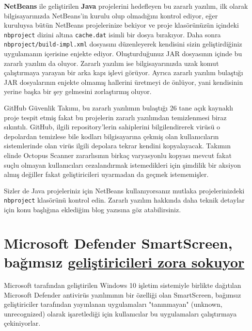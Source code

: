 \documentclass[11pt]{article}
\begin{document}
\textbf{NetBeans} ile geliştirilen \textbf{Java} projelerini hedefleyen bu zararlı yazılım,
ilk olarak bilgisayarınızda NetBeans'in kurulu olup olmadığını kontrol ediyor,
eğer kuruluysa bütün NetBeans projelerinize bekiyor ve proje klasörünüzün
içindeki \texttt{nbproject} dizini altına \texttt{cache.dat} isimli bir dosya bırakıyor.
Daha sonra \texttt{nbproject/build-impl.xml} dosyasını düzenleyerek kendisini sizin
geliştirdiğiniz uygulamanın içerisine enjekte ediyor. Oluşturduğunuz JAR
dosyasının içinde bu zararlı yazılım da oluyor. Zararlı yazılım ise
bilgisayarınızda uzak komut çalıştırmaya yarayan bir arka kapı işlevi görüyor.
Ayrıca zararlı yazılım bulaştığı JAR dosyalarının enjekte olmamış hallerini
üretmeyi de önlüyor, yani kendisinin yerine başka bir şey gelmesini
zorlaştırmış oluyor.

GitHub Güvenlik Takımı, bu zararlı yazılımın bulaştığı 26 tane açık kaynaklı
proje tespit etmiş fakat bu projelerin zararlı yazılımdan temizlenmesi biraz
sıkıntılı. GitHub, ilgili repository'lerin sahiplerini bilgilendirerek virüsü
o depolardan temizlese bile kodları bilgisayarına çekmiş olan kullanıcıların
sistemlerinde olan virüs ilgili depolara tekrar kendini kopyalayacak. Takımın
elinde Octopus Scanner zararlısının birkaç varyasyonlu kopyası mevcut fakat
suçlu olmayan kullanıcıları cezalandırmak istemedikleri için şimdilik bir
aksiyon almış değiller fakat geliştiricileri uyarmadan da geçmek istememişler.

Sizler de Java projeleriniz için NetBeans kullanıyorsanız mutlaka
projelerinizdeki \texttt{nbproject} klasörünü kontrol edin. Zararlı yazılım hakkında
daha teknik detaylar için konu başlığına eklediğim blog yazısına göz
atabilirsiniz.
\section{Microsoft Defender SmartScreen, bağımsız \href{https://getimageview.net/2020/06/02/microsoft-defender-smartscreen-is-hurting-independent-developers/}{geliştiricileri zora sokuyor}}
\label{sec:org144d4cd}
Microsoft tarafından geliştirilen Windows 10 işletim sistemiyle birlikte
dağıtılan Microsoft Defender antivirüs yazılımının bir özelliği olan
SmartScreen, bağımsız geliştiriciler tarafından yayınlanan uygulamaları
"tanınmayan" (unknown, unrecognized) olarak işaretlediği için kullanıcılar bu
uygulamaları çalıştırmaya çekiniyorlar.
\end{document}
